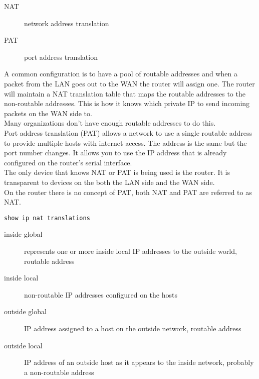 \begin{description}

\item[NAT]
network address translation  

\item[PAT]
port address translation

\end{description}

A common configuration is to have a pool of routable addresses and when a
packet from the LAN goes out to the WAN the router will assign one. The
router will maintain a NAT translation table that maps the routable addresses
to the non-routable addresses. This is how it knows which private IP to
send incoming packets on the WAN side to.\\

Many organizations don't have enough routable addresses to do this.\\

Port address translation (PAT) allows a network to use a single routable
address to provide multiple hosts with internet access. The address is the
same but the port number changes. It allows you to use the IP address that is
already configured on the router's serial interface.\\

The only device that knows NAT or PAT is being used is the router. It
is transparent to devices on the both the LAN side and the WAN side.\\

On the router there is no concept of PAT, both NAT and PAT are referred to
as NAT.

\begin{verbatim}
show ip nat translations
\end{verbatim}

\begin{description}

\item[inside global]
represents one or more inside local IP addresses to the outside world, routable
address

\item[inside local]
non-routable IP addresses configured on the hosts

\item[outside global]
IP address assigned to a host on the outside network, routable address

\item[outside local]
IP address of an outside host as it appears to the inside network, probably
a non-routable address

\end{description}

